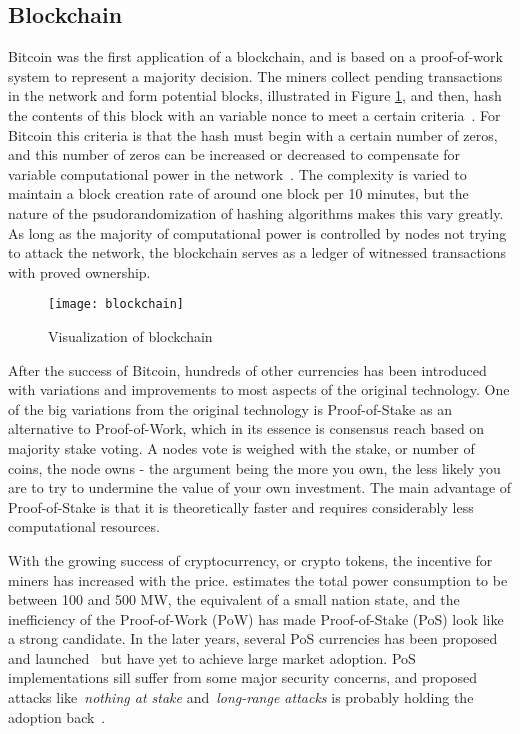 \label{sec:background_dlt}
\subsection{Blockchain}
Bitcoin was the first application of a blockchain, and is based on a proof-of-work system to represent a majority decision. The miners collect pending transactions in the network and form potential blocks, illustrated in Figure \ref{fig:blockchain}, and then, hash the contents of this block with an variable nonce to meet a certain criteria~\cite{bitcoin2008}. For Bitcoin this criteria is that the hash must begin with a certain number of zeros, and this number of zeros can be increased or decreased to compensate for variable computational power in the network~\cite{bitcoin2008}. The complexity is varied to maintain a block creation rate of around one block per 10 minutes, but the nature of the psudorandomization of hashing algorithms makes this vary greatly. As long as the majority of computational power is controlled by nodes not trying to attack the network, the blockchain serves as a ledger of witnessed transactions with proved ownership.

\begin{figure}[ht]
    \centering
    \texttt{[image: blockchain]}
    \caption{Visualization of blockchain \cite{bitcoin2008}}
    \label{fig:blockchain}
\end{figure}

After the success of Bitcoin, hundreds of other currencies has been introduced with variations and improvements to most aspects of the original technology. One of the big variations from the original technology is Proof-of-Stake as an alternative to Proof-of-Work, which in its essence is consensus reach based on majority stake voting. A nodes vote is weighed with the stake, or number of coins, the node owns - the argument being the more you own, the less likely you are to try to undermine the value of your own investment. The main advantage of Proof-of-Stake is that it is theoretically faster and requires considerably less computational resources. 

With the growing success of cryptocurrency, or crypto tokens, the incentive for miners has increased with the price. \cite{VRANKEN20171} estimates the total power consumption to be between 100 and 500 MW, the equivalent of a small nation state, and the inefficiency of the Proof-of-Work (PoW) has made Proof-of-Stake (PoS) look like a strong candidate. In the later years, several PoS currencies has been proposed and launched~\cite{Li2017,nxt_whitepaper,blackcoin_pos} but have yet to achieve large market adoption.  PoS implementations sill suffer from some major security concerns, and proposed attacks like~\textit{nothing at stake} and~\textit{long-range attacks} is probably holding the adoption back~\cite{Li2017}.

